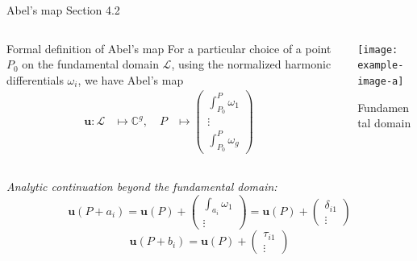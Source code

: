 \documentclass[11pt,aspectratio=169]{beamer}
\begin{document}
\begin{frame}{Abel's map}{\tiny \cite{Ber06} Section 4.2}
    \begin{columns}
        \begin{column}{0.55\textwidth}
            \begin{block}{Formal definition of Abel's map}
                For a particular choice of a point $P_0$ on the fundamental domain $\mathcal L$, using the normalized harmonic differentials $\omega_i$, we have Abel's map
                \begin{align*}
                    \mathbf{u} : \mathcal L & \mapsto \mathbb{C}^g , \quad P & \mapsto \begin{pmatrix} \int_{P_0}^P \omega_1 \\ \vdots \\ \int_{P_0}^P \omega_g \end{pmatrix} &
                \end{align*}
            \end{block}
        \end{column}
        \begin{column}{0.45\textwidth}
            \center

            \texttt{[image: example-image-a]}

            \tiny Fundamental domain

            \cite{ImageSource}
        \end{column}
    \end{columns}

    \emph{Analytic continuation beyond the fundamental domain:}
    \[\mathbf{u}(P+a_i) = \mathbf{u}(P) + \begin{pmatrix} \int_{a_i} \omega_1 \\ \vdots \end{pmatrix} = \mathbf{u}(P) + \begin{pmatrix} \delta_{i1} \\ \vdots \end{pmatrix}\]
    \[\mathbf{u}(P+b_i) = \mathbf{u}(P) + \begin{pmatrix} \tau_{i1} \\ \vdots \end{pmatrix}\]
\end{frame}
\end{document}
